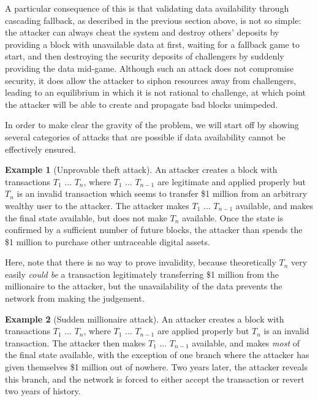 \documentclass[11pt,a4paper]{report}
\theoremstyle{plain}
\theoremstyle{definition}
\newtheorem{exmp}{Example}[section]
\theoremstyle{remark}
\begin{document}
A particular consequence of this is that validating data availability through cascading fallback, as described in the previous section above, is not so simple: the attacker can always cheat the system and destroy others' deposits by providing a block with unavailable data at first, waiting for a fallback game to start, and then destroying the security deposits of challengers by suddenly providing the data mid-game. Although such an attack does not compromise security, it does allow the attacker to siphon resources away from challengers, leading to an equilibrium in which it is not rational to challenge, at which point the attacker will be able to create and propagate bad blocks unimpeded.

In order to make clear the gravity of the problem, we will start off by showing several categories of attacks that are possible if data availability cannot be effectively ensured.

\begin{exmp}[Unprovable theft attack]
An attacker creates a block with transactions $T_1$ ... $T_n$, where $T_1$ ... $T_{n-1}$ are legitimate and applied properly but $T_n$ is an invalid transaction which seems to transfer \$1 million from an arbitrary wealthy user to the attacker. The attacker makes $T_1$ ... $T_{n-1}$ available, and makes the final state available, but does not make $T_n$ available. Once the state is confirmed by a sufficient number of future blocks, the attacker than spends the \$1 million to purchase other untraceable digital assets.

Here, note that there is no way to prove invalidity, because theoretically $T_n$ very easily \emph{could be} a transaction legitimately transferring \$1 million from the millionaire to the attacker, but the unavailability of the data prevents the network from making the judgement.
\end{exmp}

\begin{exmp}[Sudden millionaire attack]
An attacker creates a block with transactions $T_1$ ... $T_n$, where $T_1$ ... $T_{n-1}$ are applied properly but $T_n$ is an invalid transaction. The attacker then makes $T_1$ ... $T_{n-1}$ available, and makes \emph{most} of the final state available, with the exception of one branch where the attacker has given themselves \$1 million out of nowhere. Two years later, the attacker reveals this branch, and the network is forced to either accept the transaction or revert two years of history.
\end{exmp}
\end{document}
